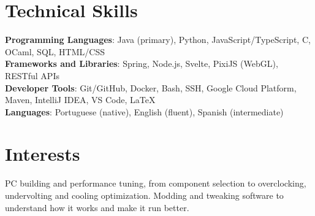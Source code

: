 \documentclass[a4paper,11pt]{article}
\begin{document}
\section{Technical Skills}
 \begin{itemize}[leftmargin=0.15in, label={}]
    \small{\item{
     \textbf{Programming Languages}{: Java (primary), Python, JavaScript/TypeScript, C, OCaml, SQL, HTML/CSS} \\
     \textbf{Frameworks and Libraries}{: Spring, Node.js, Svelte, PixiJS (WebGL), RESTful APIs} \\
     \textbf{Developer Tools}{: Git/GitHub, Docker, Bash, SSH, Google Cloud Platform, Maven, IntelliJ IDEA, VS Code, \LaTeX} \\
     \textbf{Languages}{: Portuguese (native), English (fluent), Spanish (intermediate)}
    }}
 \end{itemize}

\section{Interests}
 \begin{itemize}[leftmargin=0.15in, label={}]
    \small{\item{PC building and performance tuning, from component selection to overclocking, undervolting and cooling optimization. Modding and tweaking software to understand how it works and make it run better.}}
 \end{itemize}

\end{document}
